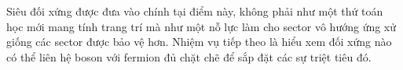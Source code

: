 Siêu đối xứng được đưa vào chính tại điểm này, không phải như một thứ toán học mới mang tính trang trí mà như một nỗ lực làm cho sector vô hướng ứng xử giống các sector được bảo vệ hơn. Nhiệm vụ tiếp theo là hiểu xem đối xứng nào có thể liên hệ boson với fermion đủ chặt chẽ để sắp đặt các sự triệt tiêu đó.
